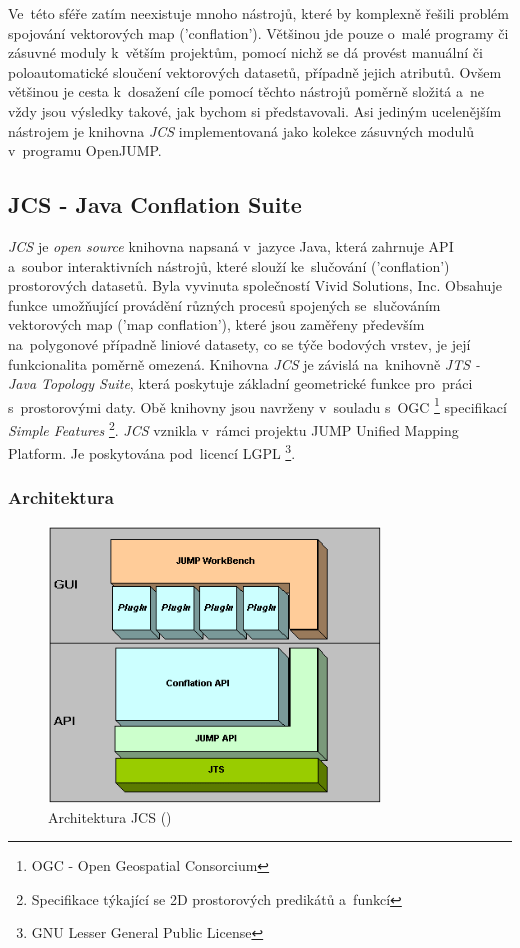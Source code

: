 Ve~této sféře zatím neexistuje mnoho nástrojů, které by komplexně řešili problém spojování vektorových map ('conflation'). Většinou jde pouze o~malé programy či
zásuvné moduly k~větším projektům, pomocí nichž se dá provést manuální či poloautomatické sloučení vektorových datasetů, případně jejich atributů. Ovšem většinou je
cesta k~dosažení cíle pomocí těchto nástrojů poměrně složitá a~ne vždy jsou výsledky takové, jak bychom si představovali. Asi jediným ucelenějším nástrojem je knihovna
\textit{JCS} implementovaná jako kolekce zásuvných modulů v~programu OpenJUMP.

\subsection{JCS - Java Conflation Suite}
\label{JCS}

\textit{JCS} je \textit{open source} knihovna napsaná v~jazyce Java, která zahrnuje API a~soubor interaktivních nástrojů, které slouží ke~slučování ('conflation') 
prostorových datasetů. Byla vyvinuta společností Vivid Solutions, Inc. Obsahuje funkce umožňující provádění různých procesů spojených se~slučováním vektorových map 
('map conflation'), které jsou zaměřeny především na~polygonové případně liniové datasety, co se týče bodových vrstev, je její funkcionalita poměrně omezená. 
Knihovna \textit{JCS} je závislá na~knihovně \textit{JTS - Java Topology Suite}, která poskytuje základní geometrické funkce pro~práci s~prostorovými
 daty. Obě knihovny jsou navrženy v~souladu s~OGC \footnote{OGC - Open Geospatial Consorcium} specifikací \textit{Simple Features} \footnote{Specifikace týkající se 2D 
prostorových predikátů a~funkcí}. \textit{JCS} vznikla v~rámci projektu JUMP Unified Mapping Platform. Je poskytována pod~licencí LGPL \footnote{GNU Lesser General Public 
License}.

\subsubsection{Architektura}
\label{jcspic}
  \begin{figure}[hbt]
    \centering
      \includegraphics[width=250pt]{./pictures/JCS_Architecture.png}
      \caption{Architektura JCS ()}
      \label{fig:architektura}
  \end{figure}



